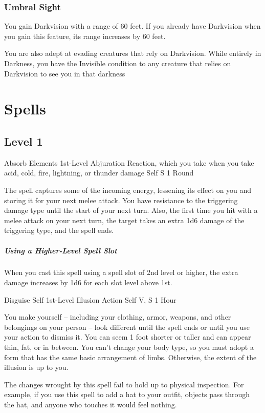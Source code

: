 \documentclass[letterpaper,openany,oneside,twocolumn]{book}
\begin{document}
\subsubsection*{Umbral Sight}
You gain Darkvision with a range of 60 feet. If you already have Darkvision when you gain this feature, its range increases by 60 feet.

You are also adept at evading creatures that rely on Darkvision. While entirely in Darkness, you have the Invisible condition to any creature that relies on Darkvision to see you in that darkness

\section*{Spells}
\subsection*{Level 1}

\DndSpellHeader
  {Absorb Elements}
  {1st-Level Abjuration}
  {Reaction, which you take when you take acid, cold, fire, lightning, or thunder damage}
  {Self}
  {S}
  {1 Round}

The spell captures some of the incoming energy, lessening its effect on you and storing it for your next melee attack. You have resistance to the triggering damage type until the start of your next turn. Also, the first time you hit with a melee attack on your next turn, the target takes an extra 1d6 damage of the triggering type, and the spell ends.

\subparagraph*{Using a Higher-Level Spell Slot} When you cast this spell using a spell slot of 2nd level or higher, the extra damage increases by 1d6 for each slot level above 1st.

\DndSpellHeader
  {Disguise Self}
  {1st-Level Illusion}
  {Action}
  {Self}
  {V, S}
  {1 Hour}

You make yourself – including your clothing, armor, weapons, and other belongings on your person – look different until the spell ends or until you use your action to dismiss it. You can seem 1 foot shorter or taller and can appear thin, fat, or in between. You can't change your body type, so you must adopt a form that has the same basic arrangement of limbs. Otherwise, the extent of the illusion is up to you.

The changes wrought by this spell fail to hold up to physical inspection. For example, if you use this spell to add a hat to your outfit, objects pass through the hat, and anyone who touches it would feel nothing.
\end{document}
